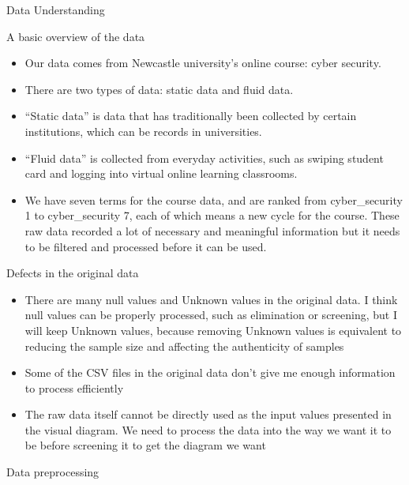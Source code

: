 \documentclass[
  ignorenonframetext,
]{beamer}
\providecommand{\tightlist}{%
  \setlength{\itemsep}{0pt}\setlength{\parskip}{0pt}}
\begin{document}
\begin{frame}{Data Understanding}
\protect\hypertarget{data-understanding}{}

\begin{block}{A basic overview of the data}

\begin{itemize}
\tightlist
\item
  Our data comes from Newcastle university's online course: cyber
  security.
\item
  There are two types of data: static data and fluid data.
\item
  ``Static data'' is data that has traditionally been collected by
  certain institutions, which can be records in universities.
\item
  ``Fluid data'' is collected from everyday activities, such as swiping
  student card and logging into virtual online learning classrooms.
\item
  We have seven terms for the course data, and are ranked from
  cyber\_security 1 to cyber\_security 7, each of which means a new
  cycle for the course. These raw data recorded a lot of necessary and
  meaningful information but it needs to be filtered and processed
  before it can be used.
\end{itemize}

\end{block}

\begin{block}{Defects in the original data}

\begin{itemize}
\item
  There are many null values and Unknown values in the original data. I
  think null values can be properly processed, such as elimination or
  screening, but I will keep Unknown values, because removing Unknown
  values is equivalent to reducing the sample size and affecting the
  authenticity of samples
\item
  Some of the CSV files in the original data don't give me enough
  information to process efficiently
\item
  The raw data itself cannot be directly used as the input values
  presented in the visual diagram. We need to process the data into the
  way we want it to be before screening it to get the diagram we want
\end{itemize}

\end{block}

\begin{block}{Data preprocessing}


\end{block}
\end{frame}
\end{document}
